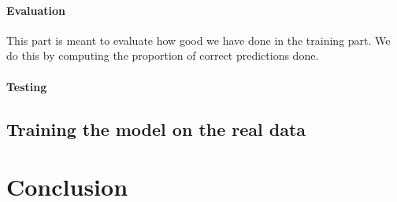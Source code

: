 \documentclass[10pt,conference,compsocconf]{IEEEtran}
\begin{document}
\paragraph{Evaluation} This part is meant to evaluate how good we have done in the training part. We do this by computing the proportion of correct predictions done.
\paragraph{Testing} %

\subsection{Training the model on the real data}

\section{Conclusion}



\end{document}
